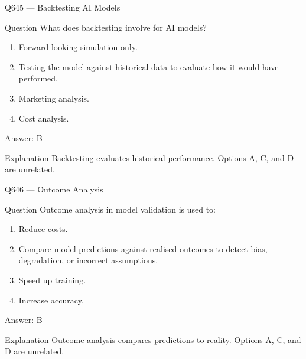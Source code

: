 \documentclass[aspectratio=169,8pt]{beamer}
\begin{document}
	\begin{frame}{Q645 --- Backtesting AI Models}
		\begin{block}{Question}
			What does backtesting involve for AI models?
			\begin{enumerate}
				\item Forward-looking simulation only.
				\item Testing the model against historical data to evaluate how it would have performed.
				\item Marketing analysis.
				\item Cost analysis.
			\end{enumerate}
		\end{block}
		\begin{exampleblock}{Answer: B}\end{exampleblock}
		\begin{block}{Explanation}
			Backtesting evaluates historical performance. Options A, C, and D are unrelated.
		\end{block}
	\end{frame}
	
	\begin{frame}{Q646 --- Outcome Analysis}
		\begin{block}{Question}
			Outcome analysis in model validation is used to:
			\begin{enumerate}
				\item Reduce costs.
				\item Compare model predictions against realised outcomes to detect bias, degradation, or incorrect assumptions.
				\item Speed up training.
				\item Increase accuracy.
			\end{enumerate}
		\end{block}
		\begin{exampleblock}{Answer: B}\end{exampleblock}
		\begin{block}{Explanation}
			Outcome analysis compares predictions to reality. Options A, C, and D are unrelated.
		\end{block}
	\end{frame}
	
\end{document}
